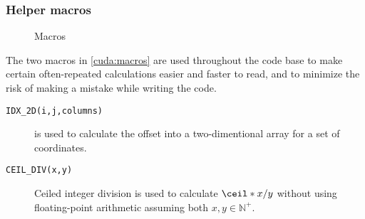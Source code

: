 \subsubsection{Helper macros}
\begin{figure}[H]
    \centering
    \caption{Macros}
    \label{cuda:macros}
\end{figure}

The two macros in \autoref{cuda:macros} are used throughout the code base to
make certain often-repeated calculations easier and faster to read, and to
minimize the risk of making a mistake while writing the code.

\begin{description}

    \item[\texttt{IDX\_2D(i,j,columns)}] is used to calculate the
        offset into a two-dimentional array for a set of coordinates.

    \item[\texttt{CEIL\_DIV(x,y)}] Ceiled integer division is used to calculate
        \(\ceil*{x/y}\) without using floating-point arithmetic assuming both
        \(x, y \in \mathbb{N}^{+} \).

\end{description}

